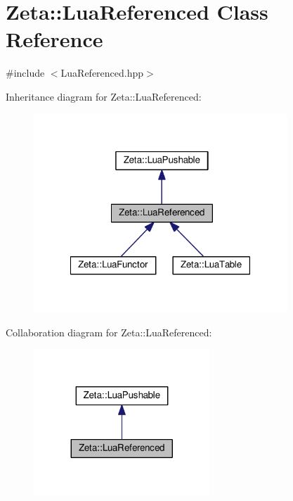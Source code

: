 \hypertarget{classZeta_1_1LuaReferenced}{\section{Zeta\+:\+:Lua\+Referenced Class Reference}
\label{classZeta_1_1LuaReferenced}
}


{\ttfamily \#include $<$Lua\+Referenced.\+hpp$>$}



Inheritance diagram for Zeta\+:\+:Lua\+Referenced\+:\nopagebreak
\begin{figure}[H]
\begin{center}
\leavevmode
\includegraphics[width=271pt]{classZeta_1_1LuaReferenced__inherit__graph}
\end{center}
\end{figure}


Collaboration diagram for Zeta\+:\+:Lua\+Referenced\+:\nopagebreak
\begin{figure}[H]
\begin{center}
\leavevmode
\includegraphics[width=188pt]{classZeta_1_1LuaReferenced__coll__graph}
\end{center}
\end{figure}
